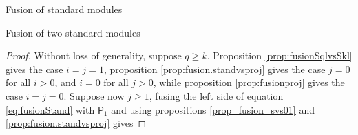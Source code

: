 \documentclass[reqno]{amsart}
\newcommand{\ds}[1]{\mathsf S_{#1}}
\newcommand{\dP}[1]{\mathsf P_{#1}}
\newcommand{\xf}{\times\hspace{-0.27em}_f}
\newcommand{\lc}{\ell}
\begin{document}
\begin{section}{Fusion of standard modules}
\begin{subsection}{Fusion of two standard modules}
\begin{proof}
Without loss of generality, suppose $q \geq k$. Proposition \ref{prop:fusionSqlvsSkl} gives the case $i=j=1$, proposition \ref{prop:fusion.standvsproj} gives the case $j=0$ for all $i>0$, and $i=0$ for all $j>0$, while proposition \ref{prop:fusionproj} gives the case $i=j=0$. Suppose now $j \geq 1$, fusing the left side of equation \eqref{eq:fusionStand} with $\dP{1}$ and using propositions \ref{prop_fusion_svs01} and \ref{prop:fusion.standvsproj} gives


\end{proof}
\end{subsection}
\end{section}
\end{document}
